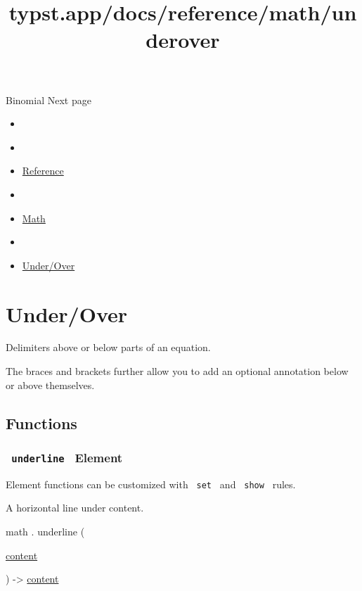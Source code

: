 { Binomial } { Next page }


\title{typst.app/docs/reference/math/underover}

\begin{itemize}
\tightlist
\item
  \href{/docs}{}
\item
  
\item
  \href{/docs/reference/}{Reference}
\item
  
\item
  \href{/docs/reference/math/}{Math}
\item
  
\item
  \href{/docs/reference/math/underover}{Under/Over}
\end{itemize}

\section{Under/Over}\label{summary}

Delimiters above or below parts of an equation.

The braces and brackets further allow you to add an optional annotation
below or above themselves.

\subsection{Functions}\label{functions}

\subsubsection{\texorpdfstring{\texttt{\ underline\ } {{ Element
}}}{ underline   Element }}\label{functions-underline}

\label{functions-underline-element-tooltip}
Element functions can be customized with \texttt{\ set\ } and
\texttt{\ show\ } rules.

A horizontal line under content.

math { . } { underline } (

{ \href{/docs/reference/foundations/content/}{content} }

) -\textgreater{} \href{/docs/reference/foundations/content/}{content}

